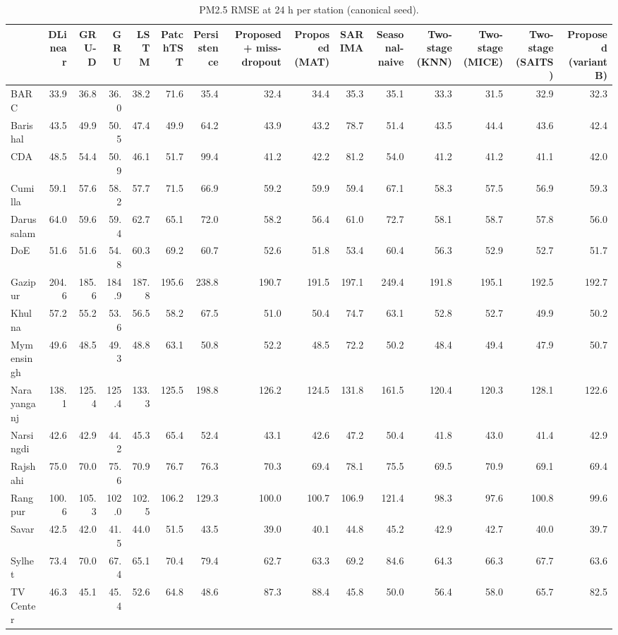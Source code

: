 \begin{table}
\caption{PM2.5 RMSE at 24 h per station (canonical seed).}
\label{tab:station_rmse}
\begin{tabular}{lrrrrrrrrrrrrrr}
\toprule
 & DLinear & GRU-D & GRU & LSTM & PatchTST & Persistence & Proposed + miss-dropout & Proposed (MAT) & SARIMA & Seasonal-naive & Two-stage (KNN) & Two-stage (MICE) & Two-stage (SAITS) & Proposed (variant B) \\
\midrule
BARC & 33.9 & 36.8 & 36.0 & 38.2 & 71.6 & 35.4 & 32.4 & 34.4 & 35.3 & 35.1 & 33.3 & 31.5 & 32.9 & 32.3 \\
Barishal & 43.5 & 49.9 & 50.5 & 47.4 & 49.9 & 64.2 & 43.9 & 43.2 & 78.7 & 51.4 & 43.5 & 44.4 & 43.6 & 42.4 \\
CDA & 48.5 & 54.4 & 50.9 & 46.1 & 51.7 & 99.4 & 41.2 & 42.2 & 81.2 & 54.0 & 41.2 & 41.2 & 41.1 & 42.0 \\
Cumilla & 59.1 & 57.6 & 58.2 & 57.7 & 71.5 & 66.9 & 59.2 & 59.9 & 59.4 & 67.1 & 58.3 & 57.5 & 56.9 & 59.3 \\
Darussalam & 64.0 & 59.6 & 59.4 & 62.7 & 65.1 & 72.0 & 58.2 & 56.4 & 61.0 & 72.7 & 58.1 & 58.7 & 57.8 & 56.0 \\
DoE & 51.6 & 51.6 & 54.8 & 60.3 & 69.2 & 60.7 & 52.6 & 51.8 & 53.4 & 60.4 & 56.3 & 52.9 & 52.7 & 51.7 \\
Gazipur & 204.6 & 185.6 & 184.9 & 187.8 & 195.6 & 238.8 & 190.7 & 191.5 & 197.1 & 249.4 & 191.8 & 195.1 & 192.5 & 192.7 \\
Khulna & 57.2 & 55.2 & 53.6 & 56.5 & 58.2 & 67.5 & 51.0 & 50.4 & 74.7 & 63.1 & 52.8 & 52.7 & 49.9 & 50.2 \\
Mymensingh & 49.6 & 48.5 & 49.3 & 48.8 & 63.1 & 50.8 & 52.2 & 48.5 & 72.2 & 50.2 & 48.4 & 49.4 & 47.9 & 50.7 \\
Narayanganj & 138.1 & 125.4 & 125.4 & 133.3 & 125.5 & 198.8 & 126.2 & 124.5 & 131.8 & 161.5 & 120.4 & 120.3 & 128.1 & 122.6 \\
Narsingdi & 42.6 & 42.9 & 44.2 & 45.3 & 65.4 & 52.4 & 43.1 & 42.6 & 47.2 & 50.4 & 41.8 & 43.0 & 41.4 & 42.9 \\
Rajshahi & 75.0 & 70.0 & 75.6 & 70.9 & 76.7 & 76.3 & 70.3 & 69.4 & 78.1 & 75.5 & 69.5 & 70.9 & 69.1 & 69.4 \\
Rangpur & 100.6 & 105.3 & 102.0 & 102.5 & 106.2 & 129.3 & 100.0 & 100.7 & 106.9 & 121.4 & 98.3 & 97.6 & 100.8 & 99.6 \\
Savar & 42.5 & 42.0 & 41.5 & 44.0 & 51.5 & 43.5 & 39.0 & 40.1 & 44.8 & 45.2 & 42.9 & 42.7 & 40.0 & 39.7 \\
Sylhet & 73.4 & 70.0 & 67.4 & 65.1 & 70.4 & 79.4 & 62.7 & 63.3 & 69.2 & 84.6 & 64.3 & 66.3 & 67.7 & 63.6 \\
TV Center & 46.3 & 45.1 & 45.4 & 52.6 & 64.8 & 48.6 & 87.3 & 88.4 & 45.8 & 50.0 & 56.4 & 58.0 & 65.7 & 82.5 \\
\bottomrule
\end{tabular}
\end{table}
